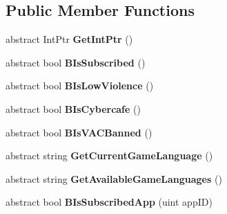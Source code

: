 \subsection*{Public Member Functions}
\begin{DoxyCompactItemize}
\item 
\hypertarget{classValve_1_1Steamworks_1_1ISteamApps_a21606a4a3470f5c65dce5702c8d68799}{}abstract Int\+Ptr {\bfseries Get\+Int\+Ptr} ()\label{classValve_1_1Steamworks_1_1ISteamApps_a21606a4a3470f5c65dce5702c8d68799}

\item 
\hypertarget{classValve_1_1Steamworks_1_1ISteamApps_a4ed56e234f93ea00d1822e2f0e539067}{}abstract bool {\bfseries B\+Is\+Subscribed} ()\label{classValve_1_1Steamworks_1_1ISteamApps_a4ed56e234f93ea00d1822e2f0e539067}

\item 
\hypertarget{classValve_1_1Steamworks_1_1ISteamApps_af724ff28ff5eaf5693068449c75ae5a7}{}abstract bool {\bfseries B\+Is\+Low\+Violence} ()\label{classValve_1_1Steamworks_1_1ISteamApps_af724ff28ff5eaf5693068449c75ae5a7}

\item 
\hypertarget{classValve_1_1Steamworks_1_1ISteamApps_a2727f519a4b5bae152fa8dc192f1f4aa}{}abstract bool {\bfseries B\+Is\+Cybercafe} ()\label{classValve_1_1Steamworks_1_1ISteamApps_a2727f519a4b5bae152fa8dc192f1f4aa}

\item 
\hypertarget{classValve_1_1Steamworks_1_1ISteamApps_a9711a5e73dd48935807993064ab4fb1f}{}abstract bool {\bfseries B\+Is\+V\+A\+C\+Banned} ()\label{classValve_1_1Steamworks_1_1ISteamApps_a9711a5e73dd48935807993064ab4fb1f}

\item 
\hypertarget{classValve_1_1Steamworks_1_1ISteamApps_a74fe7f58fe008b4000fde86a5464779b}{}abstract string {\bfseries Get\+Current\+Game\+Language} ()\label{classValve_1_1Steamworks_1_1ISteamApps_a74fe7f58fe008b4000fde86a5464779b}

\item 
\hypertarget{classValve_1_1Steamworks_1_1ISteamApps_ab932bba41dd284858909876ba1ea7738}{}abstract string {\bfseries Get\+Available\+Game\+Languages} ()\label{classValve_1_1Steamworks_1_1ISteamApps_ab932bba41dd284858909876ba1ea7738}

\item 
\hypertarget{classValve_1_1Steamworks_1_1ISteamApps_a7f9a199ed73c765ebf51986d5018e72c}{}abstract bool {\bfseries B\+Is\+Subscribed\+App} (uint app\+I\+D)\label{classValve_1_1Steamworks_1_1ISteamApps_a7f9a199ed73c765ebf51986d5018e72c}


\end{DoxyCompactItemize}

